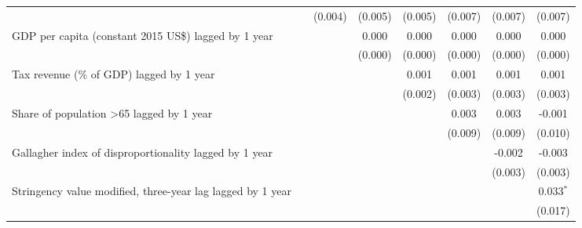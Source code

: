 \begin{tabular}{lccccccc}
                                                                                                             &               & (0.004)       & (0.005)       & (0.005)       & (0.007)       & (0.007)      & (0.007)\\   
   GDP per capita (constant 2015 US\$) lagged by 1 year                                                      &               &               & 0.000         & 0.000         & 0.000         & 0.000        & 0.000\\   
                                                                                                             &               &               & (0.000)       & (0.000)       & (0.000)       & (0.000)      & (0.000)\\   
   Tax revenue (\% of GDP) lagged by 1 year                                                                  &               &               &               & 0.001         & 0.001         & 0.001        & 0.001\\   
                                                                                                             &               &               &               & (0.002)       & (0.003)       & (0.003)      & (0.003)\\   
   Share of population >65 lagged by 1 year                                                                  &               &               &               &               & 0.003         & 0.003        & -0.001\\   
                                                                                                             &               &               &               &               & (0.009)       & (0.009)      & (0.010)\\   
   Gallagher index of disproportionality lagged by 1 year                                                    &               &               &               &               &               & -0.002       & -0.003\\   
                                                                                                             &               &               &               &               &               & (0.003)      & (0.003)\\   
   Stringency value modified, three-year lag lagged by 1 year                                                &               &               &               &               &               &              & 0.033$^{*}$\\   
                                                                                                             &               &               &               &               &               &              & (0.017)\\   

\end{tabular}
